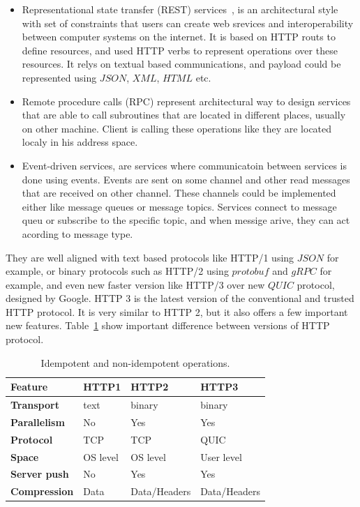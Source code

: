 \begin{itemize}
	\item Representational state transfer (REST) services~\cite{AdamczykSJH11}, is an architectural style with set of constraints that users can create web srevices and interoperability between computer systems on the internet. It is based on HTTP routs to define resources, and used HTTP verbs to represent operations over these resources. It relys on textual based communications, and payload could be represented using $JSON$, $XML$, $HTML$ etc.
	\item Remote procedure calls (RPC) represent architectural way to design services that are able to call subroutines that are located in different places, usually on other machine. Client is calling these operations like they are located localy in his address space.
	\item Event-driven services, are services where communicatoin between services is done using events. Events are sent on some channel and other read messages that are received on other channel. These channels could be implemented either like message queues or message topics. Services connect to message queu or subscribe to the specific topic, and when messige arive, they can act acording to message type.
\end{itemize}
 
 They are well aligned with text based protocols like HTTP/1 using $JSON$ for example, or binary protocols such as HTTP/2 using $protobuf$ and $gRPC$ for example, and even new faster version like HTTP/3 over new $QUIC$ protocol, designed by Google. HTTP 3 is the latest version of the conventional and trusted HTTP protocol. It is very similar to HTTP 2, but it also offers a few important new features. Table~\ref{tab:table9} show important difference between versions of HTTP protocol.
 
 \begin{table}[h!]
 	\begin{center}
 		\begin{tabular}{l|l|l|l}
 			\textbf{Feature} & \textbf{HTTP1} & \textbf{HTTP2} & \textbf{HTTP3}\\
 			\hline
 			\textbf{Transport} & text & binary & binary\\
 			\textbf{Parallelism} & No & Yes & Yes\\
 			\textbf{Protocol} & TCP & TCP & QUIC \\
 			\textbf{Space} & OS level & OS level & User level\\
 			\textbf{Server push} & No & Yes & Yes\\
 			\textbf{Compression} & Data & Data/Headers & Data/Headers\\
 		\end{tabular}
 	\end{center}
 	\vspace{-0.5cm}
 	\caption{Idempotent and non-idempotent operations.}
 	\label{tab:table9}
 \end{table}
 
